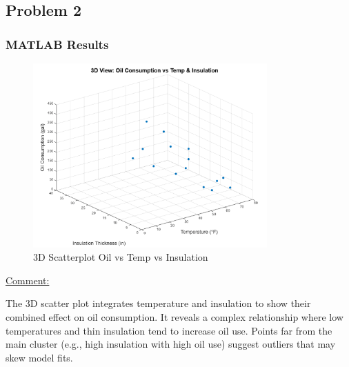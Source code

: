 \documentclass[12pt]{article}
\begin{document}
\subsection*{Problem 2}
\subsubsection*{MATLAB Results}
\begin{figure}[H]
    \centering
    \includegraphics[width=0.8\textwidth]{7.png}
    \caption{3D Scatterplot Oil vs Temp vs Insulation}
\end{figure}

\begin{adjustwidth}{0cm}{0cm}
\uline{Comment:} 
\end{adjustwidth}
The 3D scatter plot integrates temperature and insulation to show their combined effect on oil consumption. It reveals a complex relationship where low temperatures and thin insulation tend to increase oil use. Points far from the main cluster (e.g., high insulation with high oil use) suggest outliers that may skew model fits.
\end{document}
